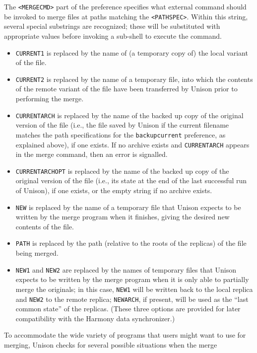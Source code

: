 \documentclass{article}
\begin{document}
The \verb|<MERGECMD>| part of the preference specifies what external command
should be invoked to merge files at paths matching the \verb|<PATHSPEC>|.
Within this string, several special substrings are recognized; these will be
substituted with appropriate values before invoking a sub-shell to execute
the command.  
\begin{itemize}
\item \relax\verb|CURRENT1| is replaced by the name of (a temporary copy of)
  the local variant of the file.
\item \relax\verb|CURRENT2| is replaced by the name of a temporary
  file, into which the contents of the remote variant of the file have
  been transferred by Unison prior to performing the merge.
\item \relax\verb|CURRENTARCH| is replaced by the name of the backed up copy
  of the original version of the file (i.e., the file saved by Unison
  if the current filename matches the path specifications for the
  \verb|backupcurrent| preference, as explained above), if one exists.
  If no archive exists and \relax\verb|CURRENTARCH| appears in the
  merge command, then an error is signalled. 
\item \relax\verb|CURRENTARCHOPT| is replaced by the name of the backed up copy
  of the original version of the file (i.e., its state at the end of
  the last successful run of Unison), if one exists, or the empty
  string if no archive exists.
\item \relax\verb|NEW| is replaced by the name of a temporary file
  that Unison expects to be written by the merge program when it
  finishes, giving the desired new contents of the file.
\item \relax\verb|PATH| is replaced by the path (relative to the roots of
  the replicas) of the file being merged.
\item \relax\verb|NEW1| and \relax\verb|NEW2| are replaced by the names of temporary files
  that Unison expects to be written by the merge program when it
  is only able to partially merge the originals; in this case, \verb|NEW1|
  will be written back to the local replica and \verb|NEW2| to the remote
  replica; \verb|NEWARCH|, if present, will be used as the ``last common
  state'' of the replicas.  (These three options are provided for
  later compatibility with the Harmony data synchronizer.)
\end{itemize}
To accommodate the wide variety of programs that users might want to use for
merging, Unison checks for several possible situations when the merge
\end{document}
